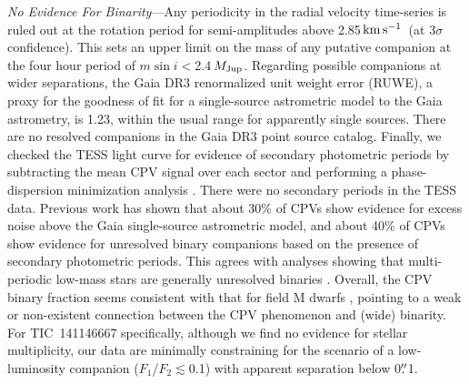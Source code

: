 \documentclass{nature3}
\newcommand{\farcs}{\mbox{\ensuremath{.\!\!^{\prime\prime}}}}%
\newcommand{\kms}{\ensuremath{\rm km\,s^{-1}}}
\begin{document}
\begin{methods}

{\it No Evidence For Binarity}---Any periodicity in the
radial velocity time-series is ruled out at the rotation period for
semi-amplitudes above 2.85\,\kms\ (at 3$\sigma$ confidence).  This
sets an upper limit on the mass of any putative companion at the four
hour period of $m \sin i $$<$2.4\,$M_{\rm Jup}$.  Regarding possible
companions at wider separations, the Gaia DR3 renormalized unit weight
error (RUWE), a proxy for the goodness of fit for a single-source
astrometric model to the Gaia astrometry, is 1.23, within the usual
range for apparently single sources.  There are no resolved companions in
the Gaia DR3 point source catalog.  Finally, we checked the TESS light
curve for evidence of secondary photometric periods by subtracting the
mean CPV signal over each sector and performing a phase-dispersion
minimization analysis \cite{Stellingwerf1978,2021zndo...1011188B}.
There were no secondary periods in the TESS data.  Previous work
\cite{Bouma2024} has shown that about 30\% of CPVs show evidence for
excess noise above the Gaia single-source astrometric model, and about
40\% of CPVs show evidence for unresolved binary companions based on
the presence of secondary photometric periods.  This agrees with
analyses showing that multi-periodic low-mass stars are generally
unresolved binaries \cite{Tokovinin2018}.  Overall, the CPV binary
fraction seems consistent with that for field M dwarfs
\cite{Winters2019}, pointing to a weak or non-existent connection
between the CPV phenomenon and (wide) binarity.  For TIC~141146667
specifically, although we find no evidence for stellar multiplicity, our
data are minimally constraining for the scenario of a low-luminosity
companion ($F_1$/$F_2$$\lesssim$0.1) with apparent separation
below 0$\farcs$1.



\end{methods}
\end{document}
